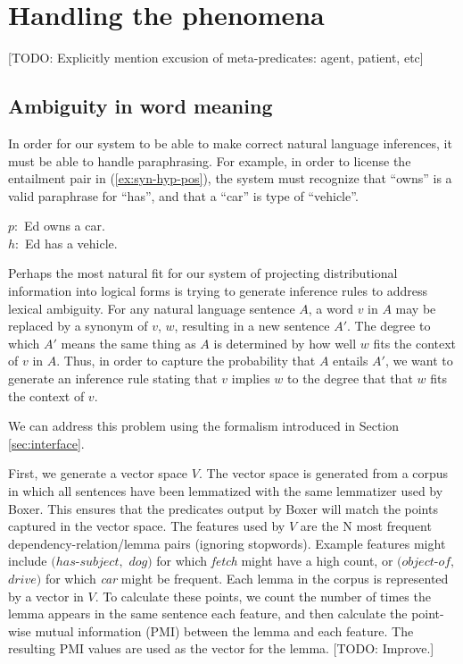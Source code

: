\section{Handling the phenomena}

[TODO: Explicitly mention excusion of meta-predicates: agent, patient, etc]

\subsection{Ambiguity in word meaning}

In order for our system to be able to make correct natural language inferences,
it must be able to handle paraphrasing.  For example, in order to license the
entailment pair in (\ref{ex:syn-hyp-pos}), the system must recognize that
``owns'' is a valid paraphrase for ``has'', and that a ``car'' is type of
``vehicle''.

\begin{example}\label{ex:syn-hyp-pos}
$p:$ Ed owns a car. \\
$h:$ Ed has a vehicle.
\end{example}

Perhaps the most natural fit for our system of projecting distributional
information into logical forms is trying to generate inference rules to address
lexical ambiguity.  For any natural language sentence $A$, a word $v$ in $A$ may
be replaced by a synonym of $v$, $w$, resulting in a new sentence $A'$.  The
degree to which $A'$ means the same thing as $A$ is determined by how well $w$
fits the context of $v$ in $A$.  Thus, in order to capture the probability that
$A$ entails $A'$, we want to generate an inference rule stating that $v$ implies
$w$ to the degree that that $w$ fits the context of $v$.

We can address this problem using the formalism introduced in
Section \ref{sec:interface}.

First, we generate a vector space $V$.  The vector space is generated from a
corpus in which all sentences have been lemmatized with the same lemmatizer used
by Boxer.  This ensures that the predicates output by Boxer will match the
points captured in the vector space.  The features used by $V$ are the N most
frequent dependency-relation/lemma pairs (ignoring stopwords).  Example features
might include $(has\text{-}subject,$ $dog)$ for which {\it fetch} might have a
high count, or $(object\text{-}of,$ $drive)$ for which {\it car} might be
frequent.  Each lemma in the corpus is represented by a vector in $V$.  To calculate these points, we
count the number of times the lemma appears in the same sentence each feature,
and then calculate the point-wise mutual information (PMI) between the lemma and
each feature.  The resulting PMI values are used as the vector for the lemma.
[TODO: Improve.]

